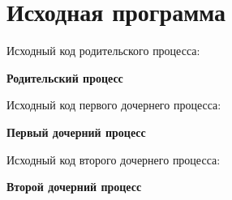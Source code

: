 \section{Исходная программа}

Исходный код родительского процесса:

\begin{center}
\textbf{Родительский процесс}
\end{center}

Исходный код первого дочернего процесса:

\begin{center}
\textbf{Первый дочерний процесс}
\end{center}

Исходный код второго дочернего процесса:

\begin{center}
\textbf{Второй дочерний процесс}
\end{center}
